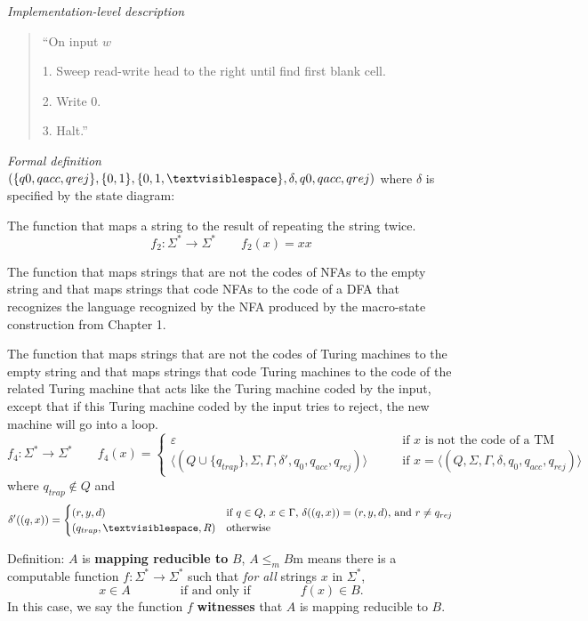 \documentclass[12pt, oneside]{article}
\begin{document}
{\it Implementation-level description}
\begin{quote}
    ``On input $w$
    
    1. Sweep read-write head to the right until find first blank cell.
    
    2. Write 0.
    
    3. Halt.''
\end{quote}

{\it Formal definition} $(\{q0, qacc, qrej\}, \{0,1\}, \{0,1,\textvisiblespace\},\delta, q0, qacc, qrej)$
where $\delta$ is specified by the state diagram: 


\newpage


The function that maps a string to the result of repeating the string twice.
\[
f_2: \Sigma^* \to \Sigma^* \qquad f_2( x )  =  xx
\]

\vfill


The function that maps strings that are not the codes of NFAs to the empty 
string and that maps strings that code NFAs to the code of a DFA that recognizes
the language recognized by the NFA produced by the macro-state construction from Chapter 1.


\vfill


The function that maps strings that are not the codes of Turing machines to the empty 
string and that maps strings that code Turing machines to the code of the 
related Turing machine that acts like the Turing machine coded by the input, except
that if this Turing machine coded by the input tries to reject, the 
new machine will go into a loop.
\[
f_4: \Sigma^* \to \Sigma^*  \qquad f_4( x )  =   \begin{cases}  \varepsilon \qquad&\text{if $x$ is not the code of  a TM} \\
\langle (Q \cup \{q_{trap} \}, \Sigma, \Gamma, \delta', q_0, q_{acc}, q_{rej} ) \rangle \qquad&\text{if $x = \langle (Q, \Sigma, \Gamma, \delta, q_0, q_{acc}, q_{rej} )\rangle$}\end{cases}
\]
where $q_{trap} \notin Q$ and 
\[\delta'( (q,x) ) = \begin{cases}
(r,y,d) &\text{if $q \in Q$, $x \in \Gamma$, $\delta ((q,x)) = (r,y,d)$, and  $r \neq  q_{rej}$} \\
(q_{trap}, \textvisiblespace, R) & \text{otherwise}
\end{cases}
\]
\vfill
\vfill

\newpage

Definition:  $A$ is  {\bf  mapping  reducible to} $B$, $A \leq_m B$m  means there is a computable function 
$f : \Sigma^* \to \Sigma^*$ such that {\it for all} strings  $x$ in $\Sigma^*$, 
\[
x  \in  A \qquad \qquad \text{if and  only  if} \qquad \qquad f(x) \in B.
\]
In this case, we say the function $f$ {\bf witnesses} that $A$ is mapping reducible to $B$.
\end{document}
